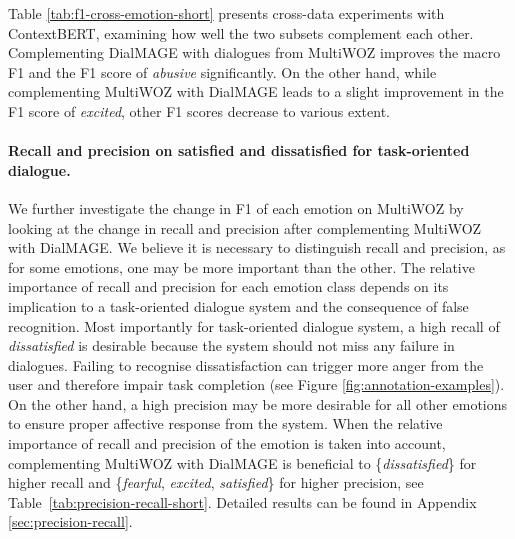 \documentclass[10pt, a4paper]{article}
\begin{document}
Table \ref{tab:f1-cross-emotion-short} presents cross-data experiments with ContextBERT, examining how well the two subsets complement each other. Complementing DialMAGE with dialogues from MultiWOZ improves the macro F1 and the F1 score of \textit{abusive} significantly. On the other hand, while complementing MultiWOZ with DialMAGE leads to a slight improvement in the F1 score of \textit{excited}, other F1 scores decrease to various extent.\par


\paragraph{Recall and precision on satisfied and dissatisfied for task-oriented dialogue.} We further investigate the change in F1 of each emotion on MultiWOZ by looking at the change in recall and precision after complementing MultiWOZ with DialMAGE. We believe it is necessary to distinguish recall and precision, as for some emotions, one may be more important than the other. The relative importance of recall and precision for each emotion class depends on its implication to a task-oriented dialogue system and the consequence of false recognition. Most importantly for task-oriented dialogue system, a high recall of \textit{dissatisfied} is desirable because the system should not miss any failure in dialogues. Failing to recognise dissatisfaction can trigger more anger from the user and therefore impair task completion (see Figure \ref{fig:annotation-examples}). On the other hand, a high precision may be more desirable for all other emotions to ensure proper affective response from the system. When the relative importance of recall and precision of the emotion is taken into account, complementing MultiWOZ with DialMAGE is beneficial to \{\textit{dissatisfied}\} for higher recall and \{\textit{fearful}, \textit{excited}, \textit{satisfied}\} for higher precision, see Table~\ref{tab:precision-recall-short}. Detailed results can be found in Appendix \ref{sec:precision-recall}.
\end{document}
